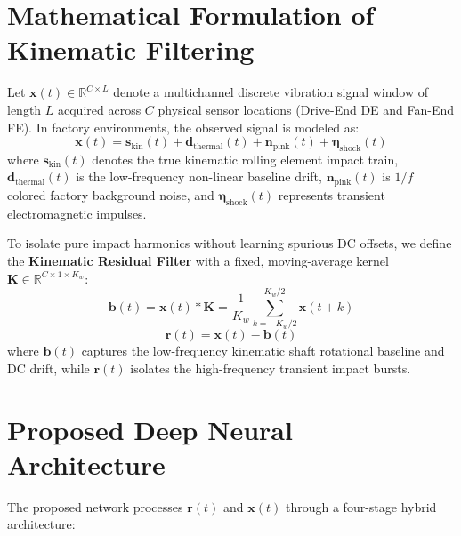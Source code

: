 ﻿\documentclass[journal,10pt,twocolumn]{IEEEtran}
\begin{document}
\section{Mathematical Formulation of Kinematic Filtering}
Let $\mathbf{x}(t) \in \mathbb{R}^{C \times L}$ denote a multichannel discrete vibration signal window of length $L$ acquired across $C$ physical sensor locations (Drive-End DE and Fan-End FE). In factory environments, the observed signal is modeled as:
\begin{equation}
    \mathbf{x}(t) = \mathbf{s}_{\text{kin}}(t) + \mathbf{d}_{\text{thermal}}(t) + \mathbf{n}_{\text{pink}}(t) + \mathbf{\eta}_{\text{shock}}(t)
\end{equation}
where $\mathbf{s}_{\text{kin}}(t)$ denotes the true kinematic rolling element impact train, $\mathbf{d}_{\text{thermal}}(t)$ is the low-frequency non-linear baseline drift, $\mathbf{n}_{\text{pink}}(t)$ is $1/f$ colored factory background noise, and $\mathbf{\eta}_{\text{shock}}(t)$ represents transient electromagnetic impulses.

To isolate pure impact harmonics without learning spurious DC offsets, we define the \textbf{Kinematic Residual Filter} with a fixed, moving-average kernel $\mathbf{K} \in \mathbb{R}^{C \times 1 \times K_w}$:
\begin{equation}
    \mathbf{b}(t) = \mathbf{x}(t) * \mathbf{K} = \frac{1}{K_w} \sum_{k=-K_w/2}^{K_w/2} \mathbf{x}(t+k)
\end{equation}
\begin{equation}
    \mathbf{r}(t) = \mathbf{x}(t) - \mathbf{b}(t)
\end{equation}
where $\mathbf{b}(t)$ captures the low-frequency kinematic shaft rotational baseline and DC drift, while $\mathbf{r}(t)$ isolates the high-frequency transient impact bursts.

\section{Proposed Deep Neural Architecture}
The proposed network processes $\mathbf{r}(t)$ and $\mathbf{x}(t)$ through a four-stage hybrid architecture:
\end{document}
